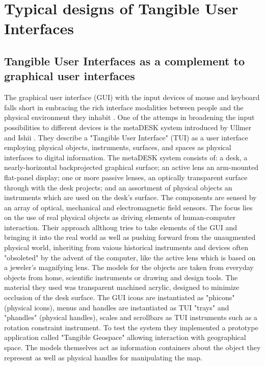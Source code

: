 \section{Typical designs of Tangible User Interfaces}

\subsection{Tangible User Interfaces as a complement to graphical user interfaces}

The graphical user interface (GUI) with the input devices of mouse and keyboard falls short in embracing the rich interface modalities between people and the physical environment they inhabit \cite{ullmer97}. 
One of the attemps in broadening the input possibilities to different devices is the metaDESK system introduced by Ullmer and Ishii \cite{ullmer97}. They describe a "Tangible User Interface" (TUI) as a user interface employing physical objects, instruments, surfaces, and spaces as physical interfaces to digital information. The metaDESK system consists of: a desk, a nearly-horizontal backprojected graphical surface; an active lens an arm-mounted flat-panel display; one or more passive lenses, an optically transparent surface through with the desk projects; and an assortment of physical objects an instruments which are used on the desk's surface. The components are sensed by an array of optical, mechanical and electromagnetic field sensors. The focus lies on the use of real physical objects as driving elements of human-computer interaction. Their approach allthoug tries to take elements of the GUI and bringing it into the real world as well as pushing forward from the unaugmented physical world, inheriting from vaious historical instruments and devices often "obsoleted" by the advent of the computer, like the active lens which is based on a jeweler's magnifying lens. The models for the objects are taken from everyday objects from home, scientific instruments or drawing and design tools. The material they used was transparent machined acrylic, designed to minimize occlusion of the desk surface.
The GUI icons are instantiated as "phicons" (physical icons), menus and handles are instantiated as TUI "trays" and "phandles" (physical handles), scales and scrollbars as TUI instruments such as a rotation constraint instrument. To test the system they implemented a prototype application called "Tangible Geospace" allowing interaction with geographical space.
The models themselves act as information containers about the object they represent as well as physical handles for manipulating the map.
